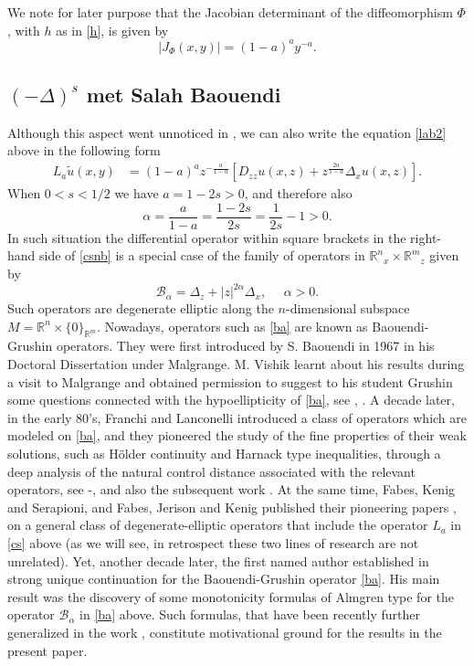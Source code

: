 \documentclass[11pt]{amsart}
\theoremstyle{plain}
\numberwithin{equation}{section}
\begin{document}
We note for later purpose that the Jacobian determinant of the  diffeomorphism $\Phi$, with $h$ as in \eqref{h}, is given by
\begin{equation}\label{j}
|J_\Phi(x,y)| = (1-a)^a y^{-a}.
\end{equation}

\subsection{$(-\Delta)^s$ met Salah Baouendi}\label{S:sb}
Although this aspect went unnoticed in \cite{CS}, we can also write the equation \eqref{lab2} above in the following form
\begin{align}\label{csnb}
L_a \tilde u(x,y) & =  (1-a)^a z^{-\frac{a}{1-a}} \left[D_{zz} u(x,z) + z^{\frac{2a}{1-a}} \Delta_x u(x,z)\right].
\end{align}
When $0<s<1/2$ we have $a = 1-2s>0$, and therefore also
\begin{equation}\label{alpha}
\alpha = \frac{a}{1-a} = \frac{1-2s}{2s} = \frac{1}{2s} - 1>0.
\end{equation}
 In such situation the differential operator within square brackets in the right-hand side of \eqref{csnb} is a special case of the family of operators in ${\mathbb R^n}_x\times {\mathbb R^m}_z$ given by
 \begin{equation}\label{ba}
 {\mathcal{B}_\alpha}=\Delta_z+ |z|^{2\alpha}\Delta_x,\ \ \ \ \ \ \alpha >0.
\end{equation}
Such operators are degenerate elliptic along the $n$-dimensional subspace $M = {\mathbb R^n} \times  \{0\}_{{\mathbb R}^m} $. Nowadays, operators such as \eqref{ba} are known as Baouendi-Grushin operators. They were first introduced by S. Baouendi in 1967 in his Doctoral Dissertation \cite{B} under Malgrange. M. Vishik learnt about his results during a visit to Malgrange and obtained permission to suggest to his student Grushin some questions connected with the hypoellipticity of \eqref{ba}, see \cite{Gr1}, \cite{Gr2}.  A decade later, in the early 80's, Franchi and Lanconelli introduced a class of operators which are modeled on \eqref{ba}, and they pioneered the study of the fine properties of their weak solutions, such as H\"older continuity and Harnack type inequalities, through a deep analysis of the natural control distance associated with the relevant operators, see \cite{FL1}-\cite{FL5}, and also the subsequent work \cite{FS}. At the same time, Fabes, Kenig and Serapioni, and Fabes, Jerison and Kenig published their pioneering papers \cite{FKS}, \cite{FJK} on a general class of degenerate-elliptic operators that include the operator $L_a$ in \eqref{cs} above (as we will see, in retrospect these two lines of research are not unrelated). Yet, another decade later, the first named author established in \cite{G} strong unique continuation for the Baouendi-Grushin operator \eqref{ba}. His main result was the discovery of some monotonicity formulas of Almgren type for the operator ${\mathcal{B}_\alpha}$ in \eqref{ba} above. Such formulas, that have been recently further generalized in the work \cite{GR}, constitute motivational ground for the results in the present paper.
\end{document}
